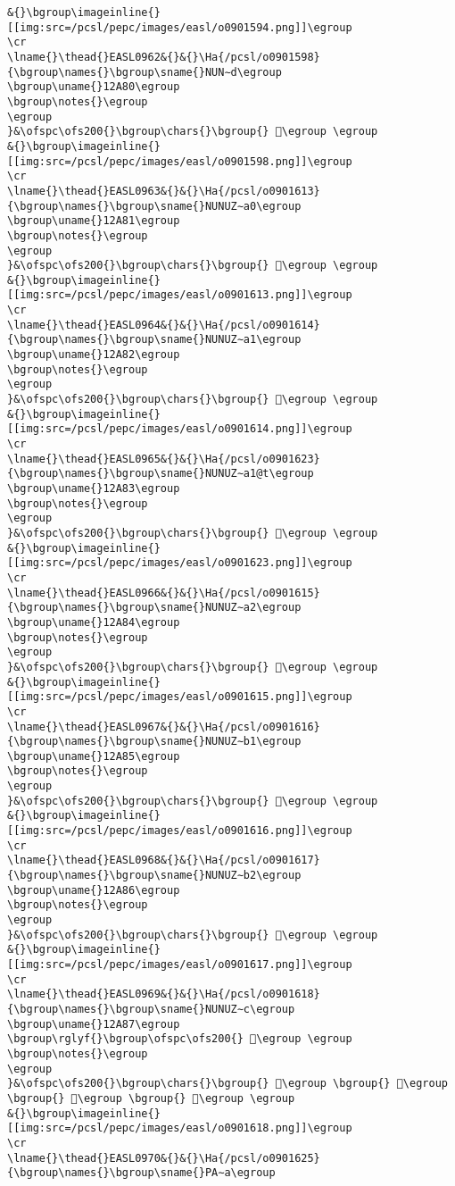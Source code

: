 \begin{verbatim}
&{}\bgroup\imageinline{}[[img:src=/pcsl/pepc/images/easl/o0901594.png]]\egroup
\cr
\lname{}\thead{}EASL0962&{}&{}\Ha{/pcsl/o0901598}{\bgroup\names{}\bgroup\sname{}NUN∼d\egroup
\bgroup\uname{}12A80\egroup
\bgroup\notes{}\egroup
\egroup
}&\ofspc\ofs200{}\bgroup\chars{}\bgroup{} 𒪀\egroup \egroup
&{}\bgroup\imageinline{}[[img:src=/pcsl/pepc/images/easl/o0901598.png]]\egroup
\cr
\lname{}\thead{}EASL0963&{}&{}\Ha{/pcsl/o0901613}{\bgroup\names{}\bgroup\sname{}NUNUZ∼a0\egroup
\bgroup\uname{}12A81\egroup
\bgroup\notes{}\egroup
\egroup
}&\ofspc\ofs200{}\bgroup\chars{}\bgroup{} 𒪁\egroup \egroup
&{}\bgroup\imageinline{}[[img:src=/pcsl/pepc/images/easl/o0901613.png]]\egroup
\cr
\lname{}\thead{}EASL0964&{}&{}\Ha{/pcsl/o0901614}{\bgroup\names{}\bgroup\sname{}NUNUZ∼a1\egroup
\bgroup\uname{}12A82\egroup
\bgroup\notes{}\egroup
\egroup
}&\ofspc\ofs200{}\bgroup\chars{}\bgroup{} 𒪂\egroup \egroup
&{}\bgroup\imageinline{}[[img:src=/pcsl/pepc/images/easl/o0901614.png]]\egroup
\cr
\lname{}\thead{}EASL0965&{}&{}\Ha{/pcsl/o0901623}{\bgroup\names{}\bgroup\sname{}NUNUZ∼a1@t\egroup
\bgroup\uname{}12A83\egroup
\bgroup\notes{}\egroup
\egroup
}&\ofspc\ofs200{}\bgroup\chars{}\bgroup{} 𒪃\egroup \egroup
&{}\bgroup\imageinline{}[[img:src=/pcsl/pepc/images/easl/o0901623.png]]\egroup
\cr
\lname{}\thead{}EASL0966&{}&{}\Ha{/pcsl/o0901615}{\bgroup\names{}\bgroup\sname{}NUNUZ∼a2\egroup
\bgroup\uname{}12A84\egroup
\bgroup\notes{}\egroup
\egroup
}&\ofspc\ofs200{}\bgroup\chars{}\bgroup{} 𒪄\egroup \egroup
&{}\bgroup\imageinline{}[[img:src=/pcsl/pepc/images/easl/o0901615.png]]\egroup
\cr
\lname{}\thead{}EASL0967&{}&{}\Ha{/pcsl/o0901616}{\bgroup\names{}\bgroup\sname{}NUNUZ∼b1\egroup
\bgroup\uname{}12A85\egroup
\bgroup\notes{}\egroup
\egroup
}&\ofspc\ofs200{}\bgroup\chars{}\bgroup{} 𒪅\egroup \egroup
&{}\bgroup\imageinline{}[[img:src=/pcsl/pepc/images/easl/o0901616.png]]\egroup
\cr
\lname{}\thead{}EASL0968&{}&{}\Ha{/pcsl/o0901617}{\bgroup\names{}\bgroup\sname{}NUNUZ∼b2\egroup
\bgroup\uname{}12A86\egroup
\bgroup\notes{}\egroup
\egroup
}&\ofspc\ofs200{}\bgroup\chars{}\bgroup{} 𒪆\egroup \egroup
&{}\bgroup\imageinline{}[[img:src=/pcsl/pepc/images/easl/o0901617.png]]\egroup
\cr
\lname{}\thead{}EASL0969&{}&{}\Ha{/pcsl/o0901618}{\bgroup\names{}\bgroup\sname{}NUNUZ∼c\egroup
\bgroup\uname{}12A87\egroup
\bgroup\rglyf{}\bgroup\ofspc\ofs200{} 𒪇\egroup \egroup
\bgroup\notes{}\egroup
\egroup
}&\ofspc\ofs200{}\bgroup\chars{}\bgroup{} 𒪇\egroup \bgroup{} 𒪈\egroup \bgroup{} 𒪉\egroup \bgroup{} 𒪊\egroup \egroup
&{}\bgroup\imageinline{}[[img:src=/pcsl/pepc/images/easl/o0901618.png]]\egroup
\cr
\lname{}\thead{}EASL0970&{}&{}\Ha{/pcsl/o0901625}{\bgroup\names{}\bgroup\sname{}PA∼a\egroup

\end{verbatim}
